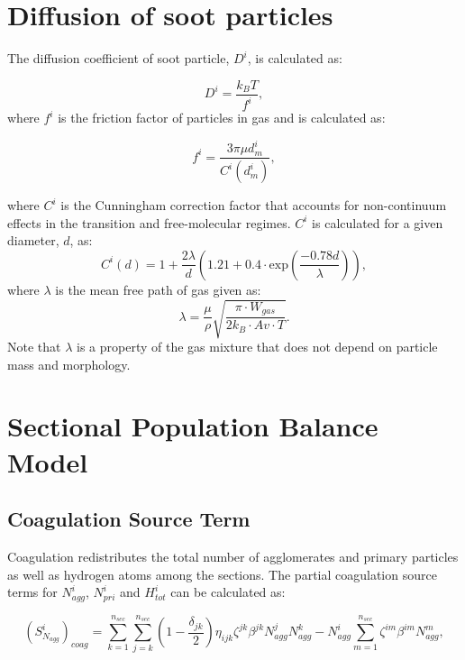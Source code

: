 \section{Diffusion of soot particles}
\label{sec:diffcoef}
The diffusion coefficient of soot particle, $D^i$, is calculated as:

\begin{equation}
	D^i = \frac{k_B T}{f^i}
	\label{eqn:diff},
\end{equation}
\noindent where $f^i$ is the friction factor of particles in gas and is calculated as:

\begin{equation}
	f^i = \frac{3\pi\mu d^i_m}{C^i(d^i_m)},
	\label{eqn:fraction}
\end{equation}

\noindent where ${C^i}$ is the Cunningham correction factor that accounts for non-continuum effects in the transition and free-molecular regimes. ${C^i}$ is calculated for a given diameter, $d$, as: 
\begin{equation}
	C^i(d) = 1+\frac{2\lambda}{d}
	\left(
	1.21+0.4\cdot\mathrm{exp}(\frac{-0.78d}{\lambda})
	\right)
	\label{eqn:cun},
\end{equation}
\noindent  where $\lambda$ is the mean free path of gas given as:
\begin{equation}
	\lambda = \frac{\mu}{\rho}\sqrt{\frac{\pi \cdot W_{gas}}{2k_B \cdot Av \cdot T}}
	\label{eqn:lambda}.
\end{equation}
Note that $\lambda$ is a property of the gas mixture that does not depend on particle mass and morphology. 

\section{Sectional Population Balance Model}
\label{sec:sectextra}

\subsection{Coagulation Source Term}
\label{sec:sectcoagsource}
Coagulation redistributes the total number of agglomerates and primary particles as well as hydrogen atoms among the sections. The partial coagulation source terms for ${N^i_{agg}}$, ${N^i_{pri}}$ and ${H^i_{tot}}$ can be calculated as:

\begin{equation}
	\left(S^i_{N_{agg}}\right)_{coag}
	=
	\sum_{k=1}^{n_{sec}}\sum_{j=k}^{n_{sec}}
	\left(
	1-\frac{\delta_{jk}}{2}
	\right)
	\eta_{ijk}\zeta^{jk}\beta^{jk}N^j_{agg}N^k_{agg}
	-
	N^i_{agg}
	\sum_{m=1}^{n_{sec}}\zeta^{im}\beta^{im}N^m_{agg},
	\label{eqn:IcoagNaggsect}
\end{equation}

